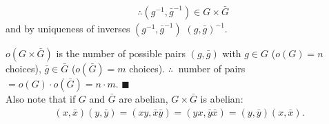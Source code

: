 \begin{proposition}
\begin{enumerate}
\begin{align}
            &\therefore (g^{-1},\bar{g}^{-1})\in G\times \bar{G} \nonumber
        \end{align}
        and by uniqueness of inverses $(g^{-1},\bar{g}^{-1})$  $(g,\bar{g})^{-1}$. \\
    \end{enumerate}
    $o(G\times \bar{G})$ is the number of possible pairs $(g,\bar{g})$ with $g\in G$ ($o(G)=n$ choices), $\bar{g}\in \bar{G}$ ($o(\bar{G})=m$ choices).
    \noindent $\therefore \ $ number of pairs $=o(G)\cdot o(\bar{G})=n\cdot m$. $\blacksquare$ \steezybreak\\
    \noindent Also note that if $G$ and $\bar{G}$ are abelian, $G\times \bar{G}$ is abelian:
        \begin{align}
            (x,\bar{x})(y,\bar{y})=(xy,\bar{x}\bar{y}) = (yx,\bar{y}\bar{x})=(y,\bar{y})(x,\bar{x}). \nonumber
        \end{align}
\end{proposition}

